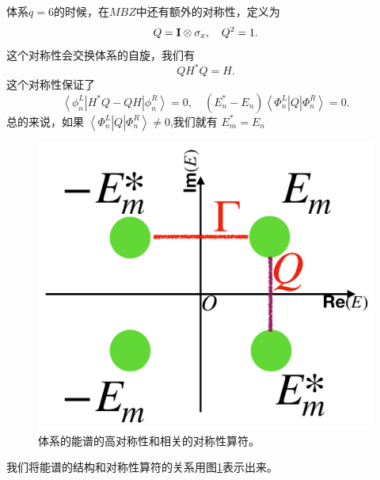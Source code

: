 \documentclass[supercite]{HustGraduPaper}
\newcommand{\bra}[1]{\left\langle #1 \right|}
\newcommand{\ket}[1]{\left| #1 \right\rangle}
\begin{document}
   	
   	体系$q = 6$的时候，在$MBZ$中还有额外的对称性，定义为
   	\begin{equation}
   	Q = {\bf I} \otimes \sigma_x, \quad Q^2 =1.
   	\end{equation}
   	这个对称性会交换体系的自旋，我们有 
   	\begin{equation}
   	Q H^* Q = H.
   	\end{equation}
   	这个对称性保证了
   	\begin{equation}
   	\bra{\phi^L_n} H^* Q - QH\ket{\phi^R_n}=0, \quad (E_n^* - E_n)\bra{\Phi^L_n}Q\ket{\Phi^R_n} = 0.
   	\end{equation}
   	总的来说，如果 $\bra{\Phi^L_n}Q\ket{\Phi^R_n} \ne 0$,我们就有 $E_m^* = E_n$
   	\begin{figure}
   		\centering
   		\includegraphics[width=0.7\linewidth]{Figures/topoinsu/sym}
   		\caption{体系的能谱的高对称性和相关的对称性算符。}
   		\label{fig:sym}
   	\end{figure}
   	我们将能谱的结构和对称性算符的关系用图\ref{fig:sym}表示出来。
   	
\end{document}
